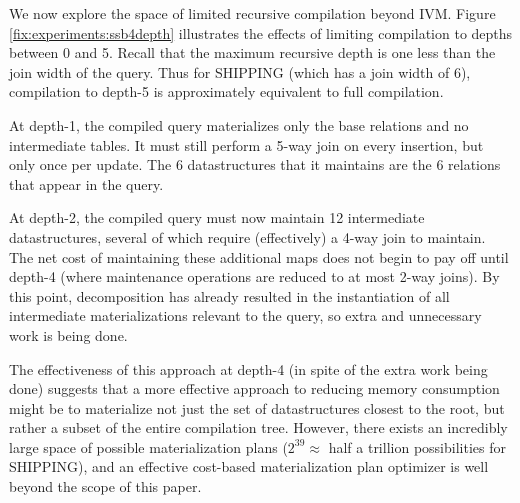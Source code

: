 We now explore the space of limited recursive compilation beyond IVM.  Figure \ref{fix:experiments:ssb4depth} illustrates the effects of limiting compilation to depths between 0 and 5.  Recall that the maximum recursive depth is one less than the join width of the query.  Thus for SHIPPING (which has a join width of 6), compilation to depth-5 is approximately equivalent to full compilation.

At depth-1, the compiled query materializes only the base relations and no intermediate tables.  It must still perform a 5-way join on every insertion, but  only once per update.  The 6 datastructures that it maintains are the 6 relations that appear in the query.  

At depth-2, the compiled query must now maintain 12 intermediate datastructures, several of which require (effectively) a 4-way join to maintain.  The net cost of maintaining these additional maps does not begin to pay off until depth-4 (where maintenance operations are reduced to at most 2-way joins).  By this point, decomposition has already resulted in the instantiation of all intermediate materializations relevant to the query, so extra and unnecessary work is being done.  

The effectiveness of this approach at depth-4 (in spite of the extra work being done) suggests that a more effective approach to reducing memory consumption might be to materialize not just the set of datastructures closest to the root, but rather a subset of the entire compilation tree.  However, there exists an incredibly large space of possible materialization plans ($2^{39} \approx $ half a trillion possibilities for SHIPPING), and an effective cost-based materialization plan optimizer is well beyond the scope of this paper.


\begin{figure}
\begin{center}
\end{center}
\end{figure}



